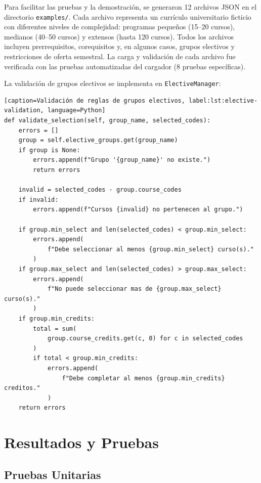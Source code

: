 \documentclass[12pt]{report}
\begin{document}
Para facilitar las pruebas y la demostración, se generaron 12 archivos JSON en el directorio \texttt{examples/}. Cada archivo representa un currículo universitario ficticio con diferentes niveles de complejidad: programas pequeños (15--20 cursos), medianos (40--50 cursos) y extensos (hasta 120 cursos). Todos los archivos incluyen prerrequisitos, corequisitos y, en algunos casos, grupos electivos y restricciones de oferta semestral. La carga y validación de cada archivo fue verificada con las pruebas automatizadas del cargador (8 pruebas específicas).

La validación de grupos electivos se implementa en \texttt{ElectiveManager}:

\begin{lstlisting}[caption=Validación de reglas de grupos electivos, label:lst:elective-validation, language=Python]
def validate_selection(self, group_name, selected_codes):
    errors = []
    group = self.elective_groups.get(group_name)
    if group is None:
        errors.append(f"Grupo '{group_name}' no existe.")
        return errors

    invalid = selected_codes - group.course_codes
    if invalid:
        errors.append(f"Cursos {invalid} no pertenecen al grupo.")

    if group.min_select and len(selected_codes) < group.min_select:
        errors.append(
            f"Debe seleccionar al menos {group.min_select} curso(s)."
        )
    if group.max_select and len(selected_codes) > group.max_select:
        errors.append(
            f"No puede seleccionar mas de {group.max_select} curso(s)."
        )
    if group.min_credits:
        total = sum(
            group.course_credits.get(c, 0) for c in selected_codes
        )
        if total < group.min_credits:
            errors.append(
                f"Debe completar al menos {group.min_credits} creditos."
            )
    return errors
\end{lstlisting}

\chapter{Resultados y Pruebas}

\section{Pruebas Unitarias}
\end{document}
